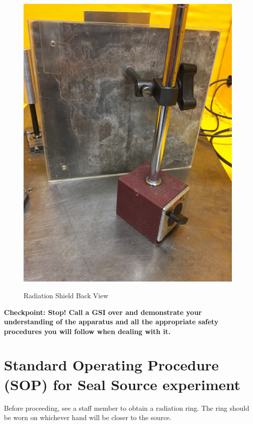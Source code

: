 \documentclass{../lab}
\begin{document}
\begin{figure}[H]
\begin{minipage}{.49\linewidth}
    \href{http://experimentationlab.berkeley.edu/sites/default/files/Shield-Back.JPG}{\includegraphics[width=\linewidth,keepaspectratio]{images/Shield-Back.JPG}} \\
    \caption{Radiation Shield Back View}
\end{minipage} 
\end{figure}

\textbf{Checkpoint: Stop! Call a GSI over and demonstrate your understanding of the apparatus and all the appropriate safety procedures you will follow when dealing with it.}

\section{Standard Operating Procedure (SOP) for Seal Source experiment}

Before proceeding, see a staff member to obtain a radiation ring. The ring should be worn on whichever hand will be closer to the source.
\end{document}
